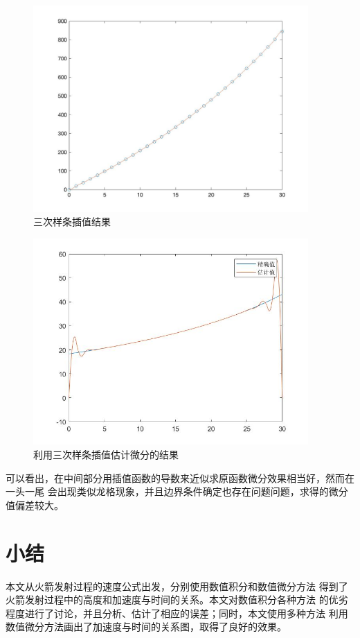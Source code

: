 \documentclass[a4paper,12pt]{ctexart}
\begin{document}
\begin{figure}[H]
    \centering
    \includegraphics[width=10.5cm]{第五章作业/sanciyangtiao.jpg}
    \caption{三次样条插值结果}
\end{figure}
\begin{figure}[H]
    \centering
    \includegraphics[width=10.5cm]{第五章作业/chazhiweifen.jpg}
    \caption{利用三次样条插值估计微分的结果}
\end{figure}

可以看出，在中间部分用插值函数的导数来近似求原函数微分效果相当好，然而在一头一尾
会出现类似龙格现象，并且边界条件确定也存在问题问题，求得的微分值偏差较大。


\section{小结}
本文从火箭发射过程的速度公式出发，分别使用数值积分和数值微分方法
得到了火箭发射过程中的高度和加速度与时间的关系。本文对数值积分各种方法
的优劣程度进行了讨论，并且分析、估计了相应的误差；同时，本文使用多种方法
利用数值微分方法画出了加速度与时间的关系图，取得了良好的效果。
\end{document}
